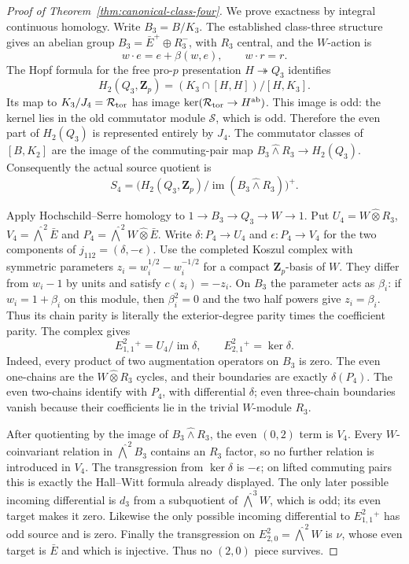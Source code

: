 \begin{proof}[Proof of Theorem~\ref{thm:canonical-class-four}]
We prove exactness by integral continuous homology.
Write $B_3=B/K_3$. The established class-three structure
gives an abelian group
$B_3=\bar E^+\oplus R_3^-$, with $R_3$ central, and
the $W$-action is
\[
 w\cdot e=e+\beta(w,e),\qquad w\cdot r=r.
\]
The Hopf formula for the free pro-$p$ presentation
$H\twoheadrightarrow Q_3$ identifies
\[
 H_2(Q_3,\mathbf Z_p)
             =(K_3\cap[H,H])/[H,K_3].
\]
Its map to $K_3/J_4=\mathcal R_{\rm tor}$ has image
$\ker(\mathcal R_{\rm tor}\to H^{\rm ab})$. This image is odd:
the kernel lies in the old commutator module $\mathcal S$,
which is odd. Therefore the even part of $H_2(Q_3)$
is represented entirely by $J_4$. The commutator
classes of $[B,K_2]$ are the image of the commuting-pair
map $B_3\widehat\wedge R_3\to H_2(Q_3)$.
Consequently the actual source quotient is
\begin{equation}\label{eq:class4-Hopf}
 S_4=\bigl(H_2(Q_3,\mathbf Z_p)/
             \operatorname{im}(B_3\widehat\wedge R_3)\bigr)^+.
\end{equation}

Apply Hochschild--Serre homology to
$1\to B_3\to Q_3\to W\to1$.
Put $U_4=W\widehat\otimes R_3$,
$V_4=\widehat\bigwedge^2\bar E$ and
$P_4=\widehat\bigwedge^2W\widehat\otimes\bar E$.
Write $\delta:P_4\to U_4$ and $\epsilon:P_4\to V_4$
for the two components of $j_{112}=(\delta,-\epsilon)$.
Use the completed Koszul complex with symmetric
parameters $z_i=w_i^{1/2}-w_i^{-1/2}$ for a compact
$\mathbf Z_p$-basis of $W$. They differ from $w_i-1$
by units and satisfy $c(z_i)=-z_i$. On $B_3$ the
parameter acts as $\beta_i$: if $w_i=1+\beta_i$ on
this module, then $\beta_i^2=0$ and the two half powers
give $z_i=\beta_i$. Thus its chain parity is literally
the exterior-degree parity times the coefficient
parity. The complex gives
\[
 E^2_{1,1}{}^+=U_4/\operatorname{im}\delta,
 \qquad E^2_{2,1}{}^+=\ker\delta.
\]
Indeed, every product of two augmentation operators
on $B_3$ is zero. The even one-chains are the
$W\widehat\otimes R_3$ cycles, and their boundaries
are exactly $\delta(P_4)$. The even two-chains identify
with $P_4$, with differential $\delta$; even three-chain
boundaries vanish because their coefficients lie in
the trivial $W$-module $R_3$.

After quotienting by the image of
$B_3\widehat\wedge R_3$, the even $(0,2)$ term is
$V_4$. Every $W$-coinvariant relation in
$\widehat\bigwedge^2B_3$ contains an $R_3$ factor,
so no further relation is introduced in $V_4$.
The transgression from $\ker\delta$ is $-\epsilon$;
on lifted commuting pairs this is exactly the
Hall--Witt formula already displayed. The only later
possible incoming differential is $d_3$ from a
subquotient of $\widehat\bigwedge^3W$, which is odd;
its even target makes it zero. Likewise the only
possible incoming differential to $E^2_{1,1}{}^+$
has odd source and is zero. Finally the transgression
on $E^2_{2,0}=\widehat\bigwedge^2W$ is $\nu$, whose
even target is $\bar E$ and which is injective.
Thus no $(2,0)$ piece survives.


\end{proof}
